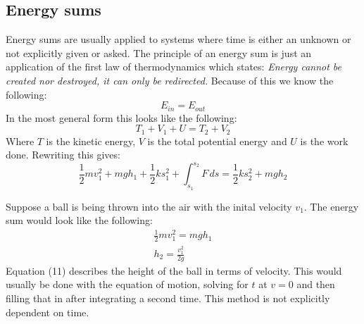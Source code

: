 \documentclass[11pt, a4paper]{article}
\begin{document}
\subsection{Energy sums}
Energy sums are usually applied to systems where time is either an unknown or not
explicitly given or asked. The principle of an energy sum is just an application of the first law
of thermodynamics which states: \textit{Energy cannot be created nor destroyed, it can only be redirected.}
Because of this we know the following:
\begin{equation}
  E_{in} = E_{out}
\end{equation}
In the most general form this looks like the following:
\begin{equation}
  T_1 + V_1 + U = T_2 + V_2
\end{equation}
Where $T$ is the kinetic energy, $V$ is the total potential energy and 
$U$ is the work done. Rewriting this gives:
\begin{equation}
  \frac{1}{2}mv_1^2 + mgh_1 + \frac{1}{2}ks_1^2 + \int_{s_1}^{s_2}F\,ds = \frac{1}{2}ks_2^2 + mgh_2
\end{equation}

Suppose a ball is being thrown into the air with the inital velocity $v_1$. The energy sum would look like the following:
\begin{gather}
  \frac{1}{2}mv_1^2 = mgh_1\\
  h_2 = \frac{v_1^2}{2g}
\end{gather}
Equation (11) describes the height of the ball in terms of velocity. This would usually be done with the equation
of motion, solving for $t$ at $v=0$ and then filling that in after integrating a second time. This method is not explicitly dependent on time.
\end{document}
